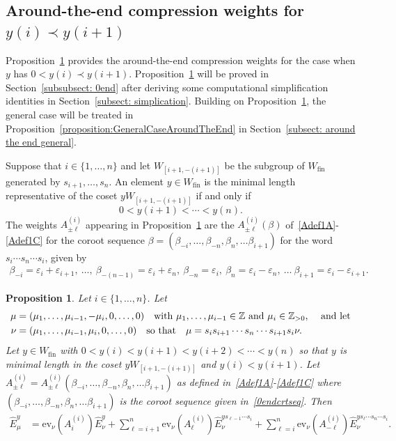 \documentclass[11pt]{article}
\theoremstyle{plain}
\newtheorem{prop}[thm]{Proposition}
\theoremstyle{definition}
\theoremstyle{remark}
\numberwithin{equation}{section}
\def\ZZ{\mathbb{Z}}
\def\ev{\mathrm{ev}}
\newcounter{r}
\newcounter{s}
\begin{document}
\subsection{Around-the-end compression weights for $y(i)\prec y(i+1)$}
\label{section:around_the_end_z1}

Proposition~\ref{0end} provides the around-the-end compression weights for the case when
$y$ has $0 < y(i) \prec y(i+1)$. Proposition~\ref{0end} 
will be proved in Section~\ref{subsubsect: 0end} after deriving some
computational simplification identities in Section~\ref{subsect: simplication}. Building on Proposition~\ref{0end}, the general case will be treated in 
Proposition~\ref{proposition:GeneralCaseAroundTheEnd} in Section~\ref{subsect: around the end general}.


Suppose that $i\in \{1, \ldots, n\}$ and let $W_{[i+1,-(i+1)]}$ be the subgroup of $W_{\mathrm{fin}}$ generated
by $s_{i+1}, \ldots, s_n$.  An element $y \in W_{\mathrm{fin}}$ is the minimal length representative of the coset
$yW_{[i+1,-(i+1)]}$ if and only if $$0 < y(i+1) < \cdots < y(n).$$ 
The weights $A^{(i)}_{\pm\ell}$ appearing in Proposition~\ref{0end} are the $A^{(i)}_{\pm\ell}(\beta)$ of~\eqref{Adef1A}-\eqref{Adef1C}
for the coroot sequence $\beta = (\beta_{-i}, \ldots, \beta_{-n}, \beta_n, \ldots \beta_{i+1})$ for the word $s_i\cdots s_n\cdots s_i$, given by
\begin{align}
\beta_{-i} = \varepsilon_i+\varepsilon_{i+1}, \ \ldots,\ \beta_{-(n-1)}=\varepsilon_i+\varepsilon_n,
\ \beta_{-n} = \varepsilon_i, \ \beta_n = \varepsilon_i-\varepsilon_n, \ \ldots\ \beta_{i+1}=\varepsilon_i-\varepsilon_{i+1}.
\label{0endcrtseq}
\end{align}


\begin{prop}  \label{0end}
Let $i\in \{1, \ldots, n\}$. Let 
\begin{align*}
\mu &= (\mu_1, \ldots, \mu_{i-1}, -\mu_i, 0, \ldots, 0)
\quad\hbox{with $\mu_1,\ldots, \mu_{i-1} \in \ZZ$ and $\mu_i \in \ZZ_{>0}$, \quad and let} \\
\nu &= (\mu_1, \ldots, \mu_{i-1}, \mu_i, 0, \ldots, 0)
\quad\hbox{so that}\quad
\mu = s_is_{i+1}\cdots s_n \cdots s_{i+1}s_i\nu.
\end{align*}
Let $y\in W_{\mathrm{fin}}$ with $0 < y(i) < y(i+1) < y(i+2) < \cdots < y(n)$ so that $y$ is minimal length in the coset $yW_{[i+1,-(i+1)]}$
and $y(i)<y(i+1)$.
Let $A^{(i)}_{\pm\ell}= A^{(i)}_{\pm\ell}(\beta_{-i}, \ldots, \beta_{-n}, \beta_n, \ldots \beta_{i+1})$ as defined in~\eqref{Adef1A}-\eqref{Adef1C}
where $(\beta_{-i}, \ldots, \beta_{-n}, \beta_n, \ldots \beta_{i+1})$ is the coroot sequence given in~\eqref{0endcrtseq}.
Then
\begin{align*}
\widehat{E}^y_\mu
&= 
\ev_\nu(A^{(i)}_{i})\widehat{E}_\nu^{y}
+
\sum_{\ell=i+1}^n \ev_\nu(A^{(i)}_{\ell})\widehat{E}_\nu^{ys_{\ell-1}\cdots s_i}
+
\sum_{\ell=i}^n \ev_\nu(A^{(i)}_{-\ell})\widehat{E}_\nu^{ys_\ell\cdots s_n\cdots s_i}.
\end{align*}
\end{prop}
\end{document}
